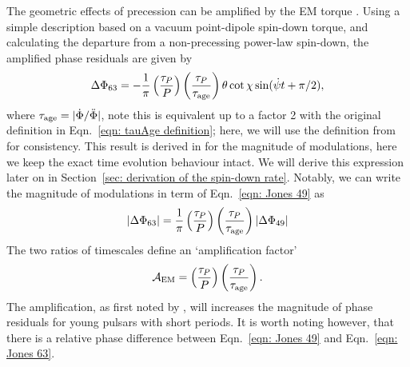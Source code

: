 \documentclass[../full_thesis/full_thesis.tex]{subfiles}
\begin{document}
The geometric effects of precession can be amplified by the EM torque \citep{Cordes1993}.
Using a simple description based on a vacuum point-dipole spin-down torque,
and calculating the departure from a non-precessing power-law spin-down,
the amplified phase residuals are given by
\begin{align}
\Delta\Phi_{63} = -\frac{1}{\pi}\left(\frac{\tau_{P}}{P}\right)
                               \left(\frac{\tau_{P}}{\tau_{\mathrm{age}}}\right)
                               \theta
                               \cot\chi
                               \sin(\dot{\psi} t + \pi/2),
\label{eqn: Jones 63}
\end{align}
where $\tau_{\mathrm{age}}=|\dot{\Phi}/\ddot{\Phi}|$, note this is equivalent up to a factor
2 with the original definition in Eqn.~\eqref{eqn: tauAge definition}; here,
we will use the definition from \citet{Jones2001} for consistency.
This result is derived in \citet{Jones2001} for the magnitude of modulations,
here we keep the exact time evolution behaviour intact. We will derive this
expression later on in Section~\ref{sec: derivation of the spin-down rate}.
Notably, we can write the magnitude of modulations in term of Eqn.~\eqref{eqn:
Jones 49} as
\begin{equation}
    |\Delta\Phi_{63}| = \frac{1}{\pi}\left(\frac{\tau_{P}}{P}\right)
    \left(\frac{\tau_{P}}{\tau_{\mathrm{age}}}\right)
                                    |\Delta\Phi_{49}|
\label{eqn: Jones 63 mag}
\end{equation}
The two ratios of timescales define an `amplification factor'
\begin{equation}
    \mathcal{A}_{\mathrm{EM}} = \left(\frac{\tau_{P}}{P}\right)
                                \left(\frac{\tau_{P}}{\tau_{\mathrm{age}}}\right).
\label{eqn: EM amplification}
\end{equation}
The amplification, as first noted by \citet{Cordes1993}, will increases the
magnitude of phase residuals for young pulsars with short periods. It is worth
noting however, that there is a relative phase difference between
Eqn.~\eqref{eqn: Jones 49} and Eqn.~\eqref{eqn: Jones 63}.
\end{document}
